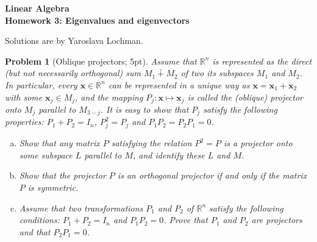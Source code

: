 \documentclass[12pt,a4]{article}
\newtheorem{problem}{Problem}
\newcommand{\bx}{{\mathbf x}}
\begin{document}
\begin{center}
  \Large\bf{Linear Algebra\\
    Homework 3: Eigenvalues and eigenvectors}
\end{center}
Solutions are by Yaroslava Lochman.


\begin{problem}[Oblique projectors; 5pt]\rm	Assume that $\mathbb{R}^n$ is represented as the \emph{direct} (but not necessarily \emph{orthogonal}) sum $M_1 \dotplus M_2$ of two its subspaces $M_1$ and $M_2$. In particular, every $\bx \in \mathbb{R}^n$ can be represented in a unique way as $\bx = \bx_1 + \bx_2$ with some $\bx_j \in M_j$, and the mapping $P_j: \bx \mapsto \bx_j$ is called the \emph{(oblique) projector onto $M_j$ parallel to $M_{3-j}$}. It is easy to show that $P_j$ satisfy the following properties: $P_1 + P_2 = I_n$, $P_j^2 = P_j$ and $P_1P_2 = P_2 P_1 = 0$. 	
		\begin{enumerate}[(a)]
		\item Show that any matrix $P$ satisfying the relation $P^2 = P$ is a projector onto some subspace $L$ parallel to $M$, and identify these $L$ and $M$.
		\item Show that the projector $P$ is an orthogonal projector if and only if the matrix $P$ is symmetric.
		\item Assume that two transformations $P_1$ and $P_2$ of $\mathbb{R}^n$ satisfy the following conditions: $P_1 + P_2 = I_n$ and $P_1P_2 = 0$. Prove that $P_1$ and $P_2$ are projectors and that $P_2P_1 = 0$.
		\end{enumerate}	
 \end{problem}
\end{document}
